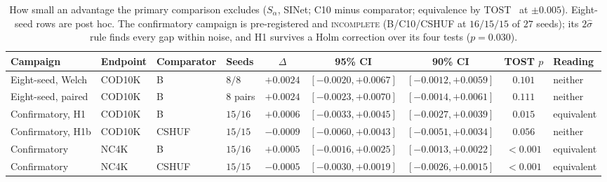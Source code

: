 \begin{table}[t]
\caption{How small an advantage the primary comparison excludes ($S_\alpha$, SINet; C10 minus comparator; equivalence by
TOST~\citep{lakens2017equivalence} at $\pm0.005$). Eight-seed rows are post hoc. The confirmatory campaign is pre-registered
and \textsc{incomplete} (B/C10/CSHUF at $16/15/15$ of $27$ seeds); its $2\hat\sigma$ rule finds every gap within noise, and
H1 survives a Holm correction over its four tests ($p = 0.030$).}
\label{tab:equiv}
\begin{center}
\scriptsize
\setlength{\tabcolsep}{2pt}
\begin{tabular}{@{}llllccccl@{}}
\toprule
Campaign & Endpoint & Comparator & Seeds & $\Delta$ & 95\% CI & 90\% CI & TOST $p$ & Reading \\
\midrule
Eight-seed, Welch & COD10K & B & $8/8$ & $+0.0024$ & $[-0.0020, +0.0067]$ & $[-0.0012, +0.0059]$ & $0.101$ & neither \\
Eight-seed, paired & COD10K & B & $8$ pairs & $+0.0024$ & $[-0.0023, +0.0070]$ & $[-0.0014, +0.0061]$ & $0.111$ & neither \\
\midrule
Confirmatory, H1 & COD10K & B & $15/16$ & $+0.0006$ & $[-0.0033, +0.0045]$ & $[-0.0027, +0.0039]$ & $\mathbf{0.015}$ & equivalent \\
Confirmatory, H1b & COD10K & CSHUF & $15/15$ & $-0.0009$ & $[-0.0060, +0.0043]$ & $[-0.0051, +0.0034]$ & $0.056$ & neither \\
Confirmatory & NC4K & B & $15/16$ & $+0.0005$ & $[-0.0016, +0.0025]$ & $[-0.0013, +0.0022]$ & $\mathbf{<0.001}$ & equivalent \\
Confirmatory & NC4K & CSHUF & $15/15$ & $-0.0005$ & $[-0.0030, +0.0019]$ & $[-0.0026, +0.0015]$ & $\mathbf{<0.001}$ & equivalent \\
\bottomrule
\end{tabular}
\end{center}
\end{table}
